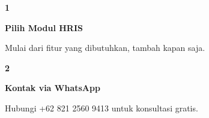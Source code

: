 \documentclass[a4paper]{article}
\begin{document}
\begin{center}
\begin{minipage}[t]{0.318\textwidth}
    \colorbox{BlueBg}{%
        \begin{minipage}{\dimexpr\linewidth-2\fboxsep\relax}
            \vspace{6pt}
            \begin{center}
                {\fontsize{22}{26}\selectfont\bfseries\color{BluePrimary} 1}
            \end{center}
            \vspace{2pt}
            \begin{center}
                {\fontsize{10}{13}\selectfont\bfseries\color{BlueDark} Pilih Modul HRIS}\par\vspace{3pt}
                {\fontsize{9}{12}\selectfont\color{TextDark} Mulai dari fitur yang dibutuhkan, tambah kapan saja.}
            \end{center}
            \vspace{6pt}
        \end{minipage}}
\end{minipage}%
\hfill
\begin{minipage}[t]{0.318\textwidth}
    \colorbox{BlueBg}{%
        \begin{minipage}{\dimexpr\linewidth-2\fboxsep\relax}
            \vspace{6pt}
            \begin{center}
                {\fontsize{22}{26}\selectfont\bfseries\color{BluePrimary} 2}
            \end{center}
            \vspace{2pt}
            \begin{center}
                {\fontsize{10}{13}\selectfont\bfseries\color{BlueDark} Kontak via WhatsApp}\par\vspace{3pt}
                {\fontsize{9}{12}\selectfont\color{TextDark} Hubungi +62 821 2560 9413 untuk konsultasi gratis.}
            \end{center}
            \vspace{6pt}
        \end{minipage}}
\end{minipage}%
\hfill
\begin{minipage}[t]{0.318\textwidth}
    \colorbox{BlueBg}{%
        \begin{minipage}{\dimexpr\linewidth-2\fboxsep\relax}
            \vspace{6pt}

\end{minipage}}
\end{minipage}
\end{center}
\end{document}
